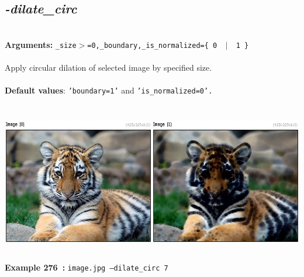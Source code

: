 \documentclass[a4paper,11pt,twoside]{book}
\begin{document}
\subsection{\emph{-dilate\_circ} }\vspace*{-0.5em}
~\\\textbf{Arguments: } 
{\small \texttt{\_size$>$=0,\_boundary,\_is\_normalized=\{ 0 ~$|$~ 1 \}}}\\~\\
Apply circular dilation of selected image by specified size.
~\\~\\\textbf{Default values}: {\small \texttt{'boundary=1'} and \texttt{'is\_normalized=0'.}}
\begin{center}\includegraphics[keepaspectratio=true,height=7cm,width=\textwidth]{img/gmic_def276.jpg}\\
{\footnotesize \textbf{Example 276~:} \texttt{image.jpg --dilate\_circ 7}}
\end{center}
\end{document}
